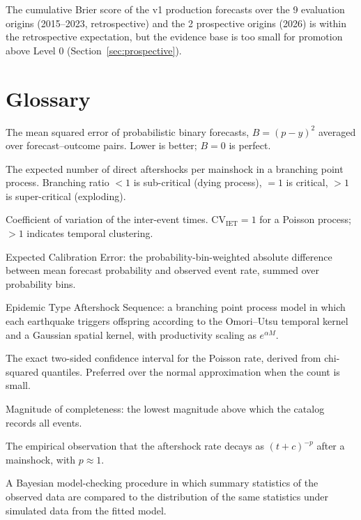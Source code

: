\documentclass[10pt,a4paper,twocolumn]{article}
\begin{document}
The cumulative Brier score of the v1 production forecasts over the 9 evaluation origins (2015--2023, retrospective) and the 2 prospective origins (2026) is within the retrospective expectation, but the evidence base is too small for promotion above Level 0 (Section~\ref{sec:prospective}).

\section{Glossary}\label{app:glossary}

\begin{description}[leftmargin=1.2em,itemsep=2pt,topsep=2pt]
\item[Brier score] The mean squared error of probabilistic binary forecasts, $B = (p - y)^2$ averaged over forecast--outcome pairs. Lower is better; $B=0$ is perfect.
\item[Branching ratio] The expected number of direct aftershocks per mainshock in a branching point process. Branching ratio $<1$ is sub-critical (dying process), $=1$ is critical, $>1$ is super-critical (exploding).
\item[CV$_{\text{IET}}$] Coefficient of variation of the inter-event times. CV$_{\text{IET}}=1$ for a Poisson process; $>1$ indicates temporal clustering.
\item[ECE] Expected Calibration Error: the probability-bin-weighted absolute difference between mean forecast probability and observed event rate, summed over probability bins.
\item[ETAS] Epidemic Type Aftershock Sequence: a branching point process model in which each earthquake triggers offspring according to the Omori--Utsu temporal kernel and a Gaussian spatial kernel, with productivity scaling as $e^{\alpha M}$.
\item[Garwood interval] The exact two-sided confidence interval for the Poisson rate, derived from chi-squared quantiles. Preferred over the normal approximation when the count is small.
\item[$M_c$] Magnitude of completeness: the lowest magnitude above which the catalog records all events.
\item[Omori law] The empirical observation that the aftershock rate decays as $(t+c)^{-p}$ after a mainshock, with $p\approx1$.
\item[Posterior predictive check] A Bayesian model-checking procedure in which summary statistics of the observed data are compared to the distribution of the same statistics under simulated data from the fitted model.

\end{description}
\end{document}
